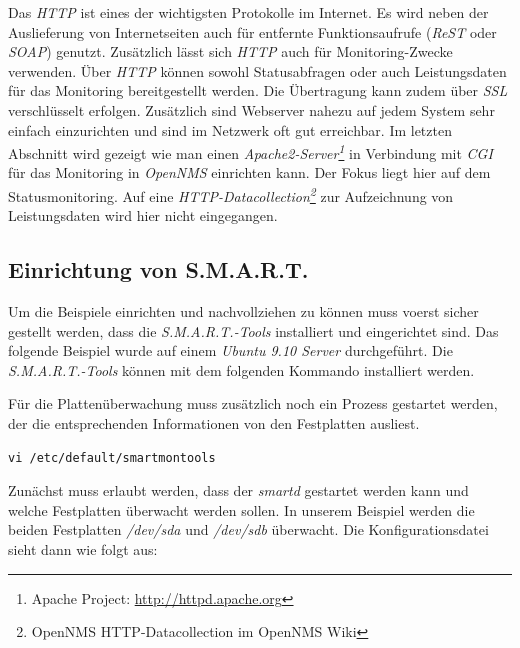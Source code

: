 Das \emph{HTTP} ist eines der wichtigsten Protokolle im Internet. Es wird neben der Auslieferung von Internetseiten auch für entfernte Funktionsaufrufe (\emph{ReST} oder \emph{SOAP}) genutzt. Zusätzlich lässt sich \emph{HTTP} auch für Monitoring-Zwecke verwenden. Über \emph{HTTP} können sowohl Statusabfragen oder auch Leistungsdaten für das Monitoring bereitgestellt werden. Die Übertragung kann zudem über \emph{SSL} verschlüsselt erfolgen. Zusätzlich sind Webserver nahezu auf jedem System sehr einfach einzurichten und sind im Netzwerk oft gut erreichbar. Im letzten Abschnitt wird gezeigt wie man einen \emph{Apache2-Server\footnote{Apache Project: \url{http://httpd.apache.org}}} in Verbindung mit \emph{CGI} für das Monitoring in \emph{OpenNMS} einrichten kann. Der Fokus liegt hier auf dem Statusmonitoring. Auf eine \emph{HTTP-Datacollection\footnote{OpenNMS HTTP-Datacollection im OpenNMS Wiki}} zur Aufzeichnung von Leistungsdaten wird hier nicht eingegangen.

\subsection{Einrichtung von S.M.A.R.T.}
Um die Beispiele einrichten und nachvollziehen zu können muss voerst sicher gestellt werden, dass die \emph{S.M.A.R.T.-Tools} installiert und eingerichtet sind. Das folgende Beispiel wurde auf einem \emph{Ubuntu 9.10 Server} durchgeführt. Die \emph{S.M.A.R.T.-Tools} können mit dem folgenden Kommando installiert werden.

Für die Plattenüberwachung muss zusätzlich noch ein Prozess gestartet werden, der die entsprechenden Informationen von den Festplatten ausliest.

\begin{lstlisting}[numbers=none]
vi /etc/default/smartmontools
\end{lstlisting}

Zunächst muss erlaubt werden, dass der \emph{smartd} gestartet werden kann und welche Festplatten überwacht werden sollen. In unserem Beispiel werden die beiden Festplatten \emph{/dev/sda} und \emph{/dev/sdb} überwacht. Die Konfigurationsdatei sieht dann wie folgt aus:

